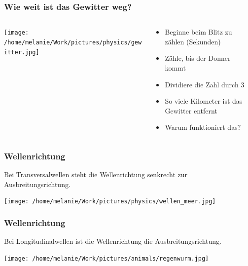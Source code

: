 \documentclass{beamer}
\begin{document}
\begin{frame}
\frametitle{Wie weit ist das Gewitter weg?}

\begin{columns}[c]

\begin{column}{5cm}

\begin{center}
\texttt{[image: /home/melanie/Work/pictures/physics/gewitter.jpg]}
\end{center}



\end{column}

\begin{column}{5cm}

\begin{itemize}
\item
Beginne beim Blitz zu zählen (Sekunden)
\item
Zähle, bis der Donner kommt
\item
Dividiere die Zahl durch 3
\item
So viele Kilometer ist das Gewitter entfernt
\item
\textcolor{theme}{Warum funktioniert das?}
\end{itemize}


\end{column}

\end{columns}


\end{frame}




\begin{frame}
\frametitle{Wellenrichtung}

Bei Transversalwellen steht die Wellenrichtung senkrecht zur Ausbreitungsrichtung. \\

\begin{center}
\texttt{[image: /home/melanie/Work/pictures/physics/wellen\_meer.jpg]}
\end{center} 


\end{frame}

\begin{frame}
\frametitle{Wellenrichtung}

Bei Longitudinalwellen ist die Wellenrichtung die Ausbreitungsrichtung. 

\begin{center}
\texttt{[image: /home/melanie/Work/pictures/animals/regenwurm.jpg]}
\end{center}

\end{frame}
\end{document}
